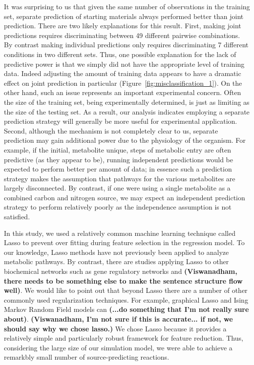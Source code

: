 \documentclass[12pt]{article}
\begin{document}
It was surprising to us that given the same number of observations in the training set, separate prediction of starting materials always performed better than joint prediction. There are two likely explanations for this result. First, making joint predictions requires discriminating between 49 different pairwise combinations. By contrast making individual predictions only requires discriminating 7 different conditions in two different sets. Thus, one possible explanation for the lack of predictive power is that we simply did not have the appropriate level of training data. Indeed adjusting the amount of training data appears to have a dramatic effect on joint prediction in particular (Figure~\ref{fig:misclassification_1}). On the other hand, such an issue represents an important experimental concern. Often the size of the training set, being experimentally determined, is just as limiting as the size of the testing set. As a result, our analysis indicates employing a separate prediction strategy will generally be more useful for experimental application. Second, although the mechanism is not completely clear to us, separate prediction may gain additional power due to the physiology of the organism. For example, if the initial, metabolite unique, steps of metabolic entry are often predictive (as they appear to be), running independent predictions would be expected to perform better per amount of data; in essence such a prediction strategy makes the assumption that pathways for the various metabolites are largely disconnected. By contrast, if one were using a single metabolite as a combined carbon and nitrogen source, we may expect an independent prediction strategy to perform relatively poorly as the independence assumption is not satisfied.

In this study, we used a relatively common machine learning technique called Lasso to prevent over fitting during feature selection in the regression model. To our knowledge, Lasso methods have not previously been applied to analyze metabolic pathways. By contrast, there are studies applying Lasso to other biochemical networks such as gene regulatory networks \cite{Menendezetal2010} and \textbf{(Viswanadham, there needs to be something else to make the sentence structure flow well)}. We would like to point out that beyond Lasso there are a number of other commonly used regularization techniques. For example, graphical Lasso \cite{Friedmanetal2008} and Ising Markov Random Field models \cite{Ravikumaretal2010} can \textbf{(...do something that I'm not really sure about)}. \textbf{(Viswanadham, I'm not sure if this is accurate... if not, we should say why we chose lasso.)} We chose Lasso because it provides a relatively simple and particularly robust framework for feature reduction. Thus, considering the large size of our simulation model, we were able to achieve a remarkbly small number of source-predicting reactions.
\end{document}

